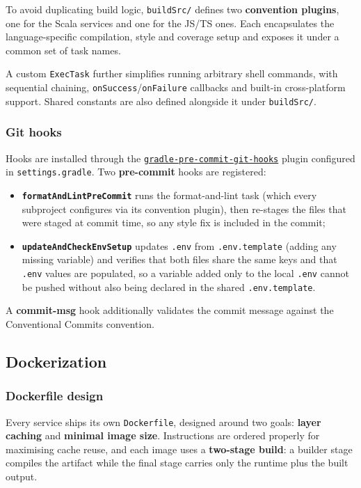 To avoid duplicating build logic, \texttt{buildSrc/} defines two \textbf{convention plugins}, one for the Scala services and one for the JS/TS ones. Each encapsulates the language-specific compilation, style and coverage setup and exposes it under a common set of task names.

A custom \texttt{ExecTask} further simplifies running arbitrary shell commands, with sequential chaining, \texttt{onSuccess}/\texttt{onFailure} callbacks and built-in cross-platform support. Shared constants are also defined alongside it under \texttt{buildSrc/}.

\subsubsection{Git hooks}

Hooks are installed through the \href{https://plugins.gradle.org/plugin/org.danilopianini.gradle-pre-commit-git-hooks/2.1.5}{\texttt{gradle-pre-commit-git-hooks}} plugin configured in \texttt{settings.gradle}. Two \textbf{pre-commit} hooks are registered:
\begin{itemize}
  \item \textbf{\texttt{formatAndLintPreCommit}} runs the format-and-lint task (which every subproject configures via its convention plugin), then re-stages the files that were staged at commit time, so any style fix is included in the commit;
  \item \textbf{\texttt{updateAndCheckEnvSetup}} updates \texttt{.env} from \texttt{.env.template} (adding any missing variable) and verifies that both files share the same keys and that \texttt{.env} values are populated, so a variable added only to the local \texttt{.env} cannot be pushed without also being declared in the shared \texttt{.env.template}.
\end{itemize}

A \textbf{commit-msg} hook additionally validates the commit message against the Conventional Commits convention.

\subsection{Dockerization}

\subsubsection{Dockerfile design}

Every service ships its own \texttt{Dockerfile}, designed around two goals: \textbf{layer caching} and \textbf{minimal image size}. Instructions are ordered properly for maximising cache reuse, and each image uses a \textbf{two-stage build}: a builder stage compiles the artifact while the final stage carries only the runtime plus the built output.

